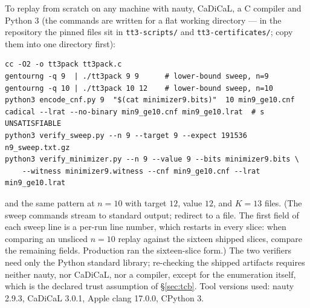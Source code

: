 \documentclass[11pt]{amsart}
\theoremstyle{plain}
\theoremstyle{definition}
\theoremstyle{remark}
\begin{document}
To replay from scratch on any machine with nauty, CaDiCaL, a C compiler
and Python 3 (the commands are written for a flat working directory ---
in the repository the pinned files sit in \texttt{tt3-scripts/} and
\texttt{tt3-certificates/}; copy them into one directory first):

\begin{verbatim}
cc -O2 -o tt3pack tt3pack.c
gentourng -q 9  | ./tt3pack 9 9      # lower-bound sweep, n=9
gentourng -q 10 | ./tt3pack 10 12    # lower-bound sweep, n=10
python3 encode_cnf.py 9  "$(cat minimizer9.bits)"  10 min9_ge10.cnf
cadical --lrat --no-binary min9_ge10.cnf min9_ge10.lrat  # s UNSATISFIABLE
python3 verify_sweep.py --n 9 --target 9 --expect 191536 n9_sweep.txt.gz
python3 verify_minimizer.py --n 9 --value 9 --bits minimizer9.bits \
    --witness minimizer9.witness --cnf min9_ge10.cnf --lrat min9_ge10.lrat
\end{verbatim}

\noindent and the same pattern at $n=10$ with target $12$, value $12$,
and $K=13$ files. (The sweep commands stream to standard output;
redirect to a file. The first field of each sweep line is a per-run line
number, which restarts in every slice: when comparing an unsliced
$n=10$ replay against the sixteen shipped slices, compare the remaining
fields. Production ran the sixteen-slice form.) The two verifiers need only the Python standard
library; re-checking the shipped artifacts requires neither nauty, nor
CaDiCaL, nor a compiler, except for the enumeration itself, which is the
declared trust assumption of \S\ref{sec:tcb}. Tool versions used: nauty
2.9.3, CaDiCaL 3.0.1, Apple clang 17.0.0, CPython 3.
\end{document}
